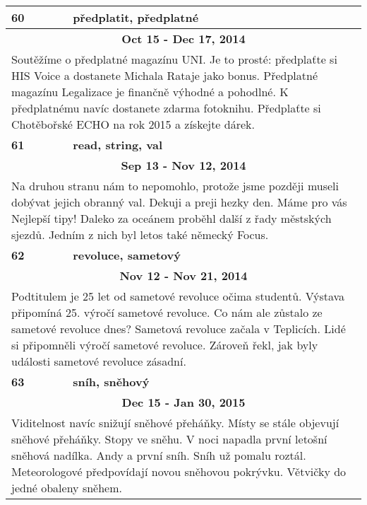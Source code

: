 \begin{tabularx}{\linewidth}{l l}
\bf 60 & \bf předplatit, předplatné \\ \midrule
\multicolumn{2}{c}{\bf Oct 15 - Dec 17, 2014} \\
\multicolumn{2}{p{\linewidth}}{Soutěžíme o předplatné magazínu UNI. Je to prosté: předplaťte si HIS Voice a dostanete Michala Rataje jako bonus. Předplatné magazínu Legalizace je finančně výhodné a pohodlné. K předplatnému navíc dostanete zdarma fotoknihu. Předplaťte si Chotěbořské ECHO na rok 2015 a získejte dárek.} \\ \midrule[1.5pt]

\bf 61 & \bf read, string, val \\ \midrule
\multicolumn{2}{c}{\bf Sep 13 - Nov 12, 2014} \\
\multicolumn{2}{p{\linewidth}}{Na druhou stranu nám to nepomohlo, protože jsme později museli dobývat jejich obranný val. Dekuji a preji hezky den. Máme pro vás Nejlepší tipy! Daleko za oceánem proběhl další z řady městských sjezdů. Jedním z nich byl letos také německý Focus.} \\ \midrule[1.5pt]

\bf 62 & \bf revoluce, sametový \\ \midrule
\multicolumn{2}{c}{\bf Nov 12 - Nov 21, 2014} \\
\multicolumn{2}{p{\linewidth}}{Podtitulem je 25 let od sametové revoluce očima studentů. Výstava připomíná 25. výročí sametové revoluce. Co nám ale zůstalo ze sametové revoluce dnes? Sametová revoluce začala v Teplicích. Lidé si připomněli výročí sametové revoluce. Zároveň řekl, jak byly události sametové revoluce zásadní.} \\ \midrule[1.5pt]

\bf 63 & \bf sníh, sněhový \\ \midrule
\multicolumn{2}{c}{\bf Dec 15 - Jan 30, 2015} \\
\multicolumn{2}{p{\linewidth}}{Viditelnost navíc snižují sněhové přeháňky. Místy se stále objevují sněhové přeháňky. Stopy ve sněhu. V noci napadla první letošní sněhová nadílka. Andy a první sníh. Sníh už pomalu roztál. Meteorologové předpovídají novou sněhovou pokrývku. Větvičky do jedné obaleny sněhem.} \\ \midrule[1.5pt]


\end{tabularx}
